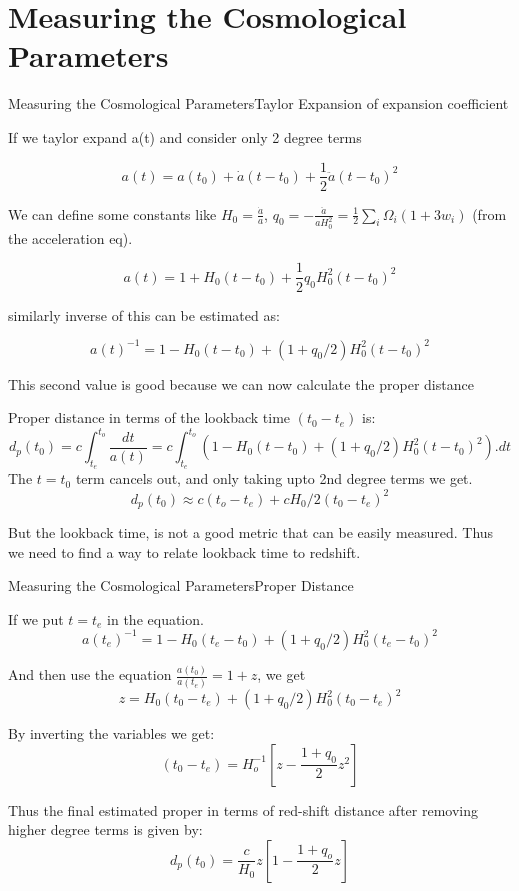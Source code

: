 \section{Measuring the Cosmological Parameters}

\begin{frame}{Measuring the Cosmological Parameters}{Taylor Expansion of expansion
coefficient}

If we taylor expand a(t) and consider only 2 degree terms

$$ a(t) = a(t_0) + \dot a (t-t_0) + \frac{1}{2} \ddot a (t-t_0)^2 $$

We can define some constants like $H_0 = \frac{\dot a}{a}$, $q_0 = -\frac{\ddot
a}{aH_0^2} = \frac{1}{2} \sum_i \Omega_i (1 + 3w_i)$ (from the acceleration eq).

$$ a(t) = 1 + H_0 (t-t_0) + \frac{1}{2} q_0 H_0^2 (t-t_0)^2 $$

similarly inverse of this can be estimated as:

$$ a(t)^{-1} = 1 - H_0 (t - t_0) + (1 + q_0 /2 ) H_0^2 (t-t_0)^2 $$

This second value is good because we can now calculate the proper distance


\end{frame}

\begin{frame}
	Proper distance in terms of the lookback time $(t_0 - t_e)$ is:
	$$ d_p(t_0) = c \int_{t_e}^{t_o} \frac{dt}{a(t)} = c \int_{t_e}^{t_o}
	(1 - H_0 (t - t_0) + (1 + q_0 /2 ) H_0^2 (t-t_0)^2 ).dt $$
	The $t=t_0$ term cancels out, and only taking upto 2nd degree terms we
	get.
	$$ d_p(t_0) \approx c(t_o - t_e) + cH_0 / 2 (t_0 - t_e)^2 $$

	But the lookback time, is not a good metric that can be easily measured.
	Thus we need to find a way to relate lookback time to redshift.
\end{frame}


\begin{frame}{Measuring the Cosmological Parameters}{Proper Distance}

	If we put $t=t_e$ in the equation.
$$ a(t_e)^{-1} = 1 - H_0 (t_e - t_0) + (1 + q_0 /2 ) H_0^2 (t_e-t_0)^2 $$

And then use the equation $\frac{a(t_0)}{a(t_e)} = 1 + z$, we get
$$ z =  H_0 (t_0 - t_e) + (1 + q_0 /2 ) H_0^2 (t_0-t_e)^2 $$

By inverting the variables we get:
$$ (t_0 - t_e) = H_o^{-1} \left[ z - \frac{1 + q_0}{2}z^2 \right] $$

	Thus the final estimated proper in terms of red-shift distance after
	removing higher degree terms is given by:
	$$ d_p(t_0) = \frac{c}{H_0} z \left[ 1 - \frac{1+q_o}{2} z \right] $$
\end{frame}

